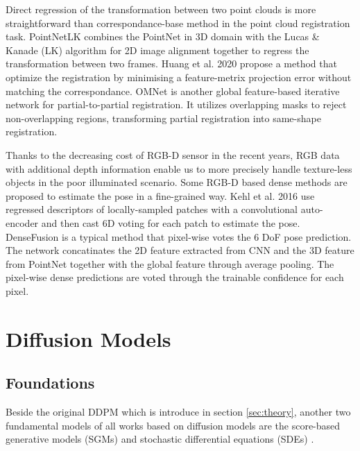 \documentclass[12pt,DIV14,BCOR12mm,a4paper,footinclude=false,headinclude,parskip=half-,twoside,openright,cleardoublepage=empty,toc=index,bibliography=totoc,listof=totoc]{scrreprt}
\numberwithin{equation}{chapter}
\begin{document}
Direct regression of the transformation between two point clouds is more straightforward than correspondance-base method in the point cloud registration task. PointNetLK \cite{aoki2019pointnetlk} combines the PointNet in 3D domain with the Lucas \& Kanade (LK) algorithm \cite{Lucas1981AnII} for 2D image alignment together to regress the transformation between two frames. Huang et al. 2020 \cite{huang2020featuremetric} propose a method that optimize the registration by minimising a feature-metrix projection error without matching the correspondance. OMNet \cite{xu2021omnet} is another global feature-based iterative network for partial-to-partial registration. It utilizes overlapping masks to reject non-overlapping regions, transforming partial registration into same-shape registration.

Thanks to the decreasing cost of RGB-D sensor in the recent years, RGB data with additional depth information enable us to more precisely handle texture-less objects in the poor illuminated scenario. Some RGB-D based dense methods are proposed to estimate the pose in a fine-grained way. Kehl et al. 2016 \cite{kehl2016deep} use regressed descriptors of locally-sampled patches with a convolutional auto-encoder and then cast 6D voting for each patch to estimate the pose. DenseFusion \cite{wang2019densefusion} is a typical method that pixel-wise votes the 6 DoF pose prediction. The network concatinates the 2D feature extracted from CNN and the 3D feature from PointNet together with the global feature through average pooling. The pixel-wise dense predictions are voted through the trainable confidence for each pixel. 

\section{Diffusion Models}
\subsection{Foundations}
Beside the original DDPM \cite{sohldickstein2015deep,ho2020denoising} which is introduce in section \ref{sec:theory}, another two fundamental models of all works based on diffusion models are the score-based generative models (SGMs) \cite{song2020generative,song2020improved} and stochastic differential equations (SDEs) \cite{song2021maximum,song2021scorebased}.
\end{document}
